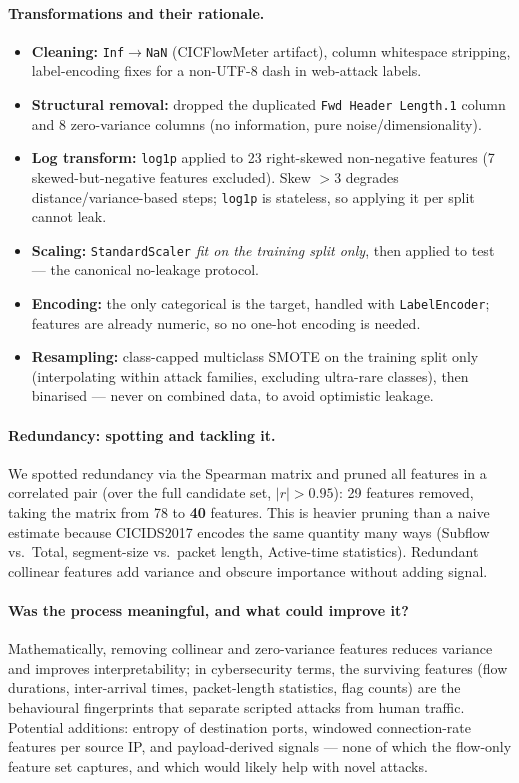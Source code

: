\documentclass[11pt,a4paper]{article}
\begin{document}
\paragraph{Transformations and their rationale.}
\begin{itemize}[leftmargin=1.4em,itemsep=2pt]
\item \textbf{Cleaning:} \texttt{Inf}$\rightarrow$\texttt{NaN} (CICFlowMeter artifact), column
whitespace stripping, label-encoding fixes for a non-UTF-8 dash in web-attack labels.
\item \textbf{Structural removal:} dropped the duplicated \texttt{Fwd Header Length.1} column
and 8 zero-variance columns (no information, pure noise/dimensionality).
\item \textbf{Log transform:} \texttt{log1p} applied to 23 right-skewed non-negative features
(7 skewed-but-negative features excluded). Skew $>3$ degrades distance/variance-based steps;
\texttt{log1p} is stateless, so applying it per split cannot leak.
\item \textbf{Scaling:} \texttt{StandardScaler} \emph{fit on the training split only}, then
applied to test --- the canonical no-leakage protocol.
\item \textbf{Encoding:} the only categorical is the target, handled with
\texttt{LabelEncoder}; features are already numeric, so no one-hot encoding is needed.
\item \textbf{Resampling:} class-capped multiclass SMOTE on the training split only
(interpolating within attack families, excluding ultra-rare classes), then binarised ---
never on combined data, to avoid optimistic leakage.
\end{itemize}

\paragraph{Redundancy: spotting and tackling it.}
We spotted redundancy via the Spearman matrix and pruned all features in a correlated pair
(over the full candidate set, $|r|>0.95$): 29 features removed, taking the matrix from
78 to \textbf{40} features. This is heavier pruning than a naive estimate because CICIDS2017
encodes the same quantity many ways (Subflow vs.\ Total, segment-size vs.\ packet length,
Active-time statistics). Redundant collinear features add variance and obscure importance
without adding signal.

\paragraph{Was the process meaningful, and what could improve it?}
Mathematically, removing collinear and zero-variance features reduces variance and improves
interpretability; in cybersecurity terms, the surviving features (flow durations, inter-arrival
times, packet-length statistics, flag counts) are the behavioural fingerprints that separate
scripted attacks from human traffic. Potential additions: entropy of destination ports,
windowed connection-rate features per source IP, and payload-derived signals --- none of which
the flow-only feature set captures, and which would likely help with novel attacks.
\end{document}
